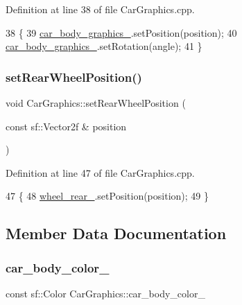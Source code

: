 Definition at line 38 of file Car\+Graphics.\+cpp.


\begin{DoxyCode}
38                                                                              \{
39     \hyperlink{classCarGraphics_a4e1969ef5f4326f10b83b1488484f660}{car\_body\_graphics\_}.setPosition(position);
40     \hyperlink{classCarGraphics_a4e1969ef5f4326f10b83b1488484f660}{car\_body\_graphics\_}.setRotation(angle);
41 \}
\end{DoxyCode}
\mbox{\label{classCarGraphics_a30a28ce4d33808d22f6ca460c5b8013d}} 
\subsubsection{\texorpdfstring{set\+Rear\+Wheel\+Position()}{setRearWheelPosition()}}
{\footnotesize\ttfamily void Car\+Graphics\+::set\+Rear\+Wheel\+Position (\begin{DoxyParamCaption}\item[{const sf\+::\+Vector2f \&}]{position }\end{DoxyParamCaption})}



Definition at line 47 of file Car\+Graphics.\+cpp.


\begin{DoxyCode}
47                                                                  \{
48     \hyperlink{classCarGraphics_a2a66d0c60b79f54a807a31afd76c4ad1}{wheel\_rear\_}.setPosition(position);
49 \}
\end{DoxyCode}


\subsection{Member Data Documentation}
\mbox{\label{classCarGraphics_a3df8d600a272817a5c521cdc8c23c587}} 
\subsubsection{\texorpdfstring{car\+\_\+body\+\_\+color\+\_\+}{car\_body\_color\_}}
{\footnotesize\ttfamily const sf\+::\+Color Car\+Graphics\+::car\+\_\+body\+\_\+color\+\_\+\hspace{0.3cm}{\ttfamily [private]}}



